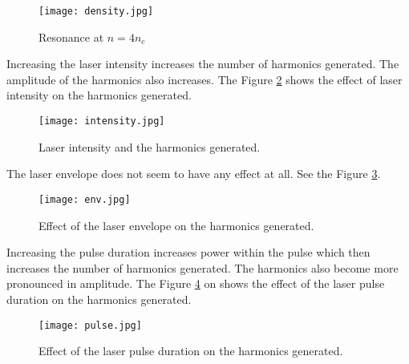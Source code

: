 \begin{figure}[H]
    \centering
    \texttt{[image: density.jpg]}
    \caption{Resonance at $n = 4n_c$}
    \label{fig:density}
\end{figure}

Increasing the laser intensity increases the number of harmonics generated. The amplitude of the harmonics also increases. The Figure \ref{fig:intensity} shows the effect of laser intensity on the harmonics generated.

\begin{figure}[h]
    \centering
    \texttt{[image: intensity.jpg]}
    \caption{Laser intensity and the harmonics generated.}
    \label{fig:intensity}
\end{figure}


The laser envelope does not seem to have any effect at all. See the Figure \ref{fig:env}.

\begin{figure}[H]
    \centering
    \texttt{[image: env.jpg]}
    \caption{Effect of the laser envelope on the harmonics generated.}
    \label{fig:env}
\end{figure}



Increasing the pulse duration increases power within the pulse which then increases the number of harmonics generated. The harmonics also become more pronounced in amplitude. The Figure \ref{fig:pulse} on shows the effect of the laser pulse duration on the harmonics generated.

\begin{figure}[H]
    \centering
    \texttt{[image: pulse.jpg]}
    \caption{Effect of the laser pulse duration on the harmonics generated.}
    \label{fig:pulse}
\end{figure}



